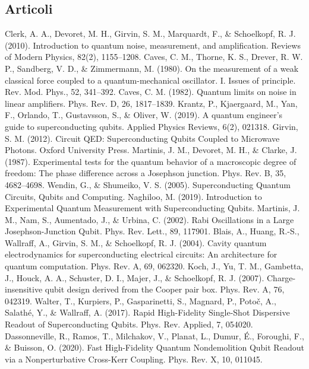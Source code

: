 \begin{thebibliography}{12}
\section*{Articoli}
Clerk, A. A., Devoret, M. H., Girvin, S. M., Marquardt, F., \& Schoelkopf, R. J. (2010). Introduction to quantum noise, measurement, and amplification. Reviews of Modern Physics, 82(2), 1155–1208.
Caves, C. M., Thorne, K. S., Drever, R. W. P., Sandberg, V. D., \& Zimmermann, M. (1980). On the measurement of a weak classical force coupled to a quantum-mechanical oscillator. I. Issues of principle. Rev. Mod. Phys., 52, 341–392.
Caves, C. M. (1982). Quantum limits on noise in linear amplifiers. Phys. Rev. D, 26, 1817–1839.
Krantz, P., Kjaergaard, M., Yan, F., Orlando, T., Gustavsson, S., \& Oliver, W. (2019). A quantum engineer’s guide to superconducting qubits. Applied Physics Reviews, 6(2), 021318.
Girvin, S. M. (2012). Circuit QED: Superconducting Qubits Coupled to Microwave Photons. Oxford University Press.
Martinis, J. M., Devoret, M. H., \& Clarke, J. (1987). Experimental tests for the quantum behavior of a macroscopic degree of freedom: The phase difference across a Josephson junction. Phys. Rev. B, 35, 4682–4698.
Wendin, G., \& Shumeiko, V. S. (2005). Superconducting Quantum Circuits, Qubits and Computing.
Naghiloo, M. (2019). Introduction to Experimental Quantum Measurement with Superconducting Qubits.
Martinis, J. M., Nam, S., Aumentado, J., \& Urbina, C. (2002). Rabi Oscillations in a Large Josephson-Junction Qubit. Phys. Rev. Lett., 89, 117901.
Blais, A., Huang, R.-S., Wallraff, A., Girvin, S. M., \& Schoelkopf, R. J. (2004). Cavity quantum electrodynamics for superconducting electrical circuits: An architecture for quantum computation. Phys. Rev. A, 69, 062320.
Koch, J., Yu, T. M., Gambetta, J., Houck, A. A., Schuster, D. I., Majer, J., \& Schoelkopf, R. J. (2007). Charge-insensitive qubit design derived from the Cooper pair box. Phys. Rev. A, 76, 042319.
Walter, T., Kurpiers, P., Gasparinetti, S., Magnard, P., Potoč, A., Salathé, Y., \& Wallraff, A. (2017). Rapid High-Fidelity Single-Shot Dispersive Readout of Superconducting Qubits. Phys. Rev. Applied, 7, 054020.
Dassonneville, R., Ramos, T., Milchakov, V., Planat, L., Dumur, É., Foroughi, F., \& Buisson, O. (2020). Fast High-Fidelity Quantum Nondemolition Qubit Readout via a Nonperturbative Cross-Kerr Coupling. Phys. Rev. X, 10, 011045.
\end{thebibliography}